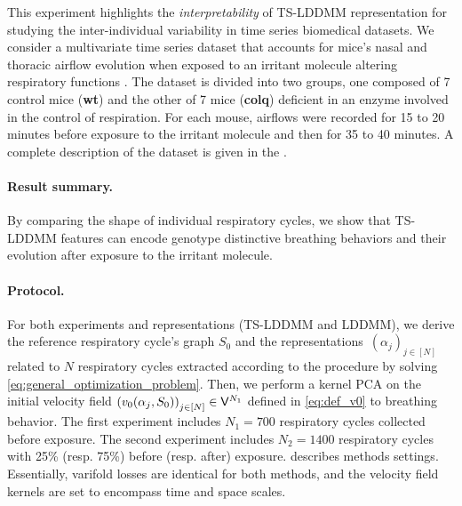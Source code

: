 
This experiment highlights the \textit{interpretability} of TS-LDDMM representation for studying the inter-individual variability in time series biomedical datasets. We consider a multivariate time series dataset that accounts for mice's nasal and thoracic airflow evolution when exposed to an irritant molecule altering respiratory functions \cite{nervo2019respiratory}.
The dataset is divided into two groups, one composed of 7 control mice (\textbf{wt}) and the other of 7 mice (\textbf{colq}) deficient in an enzyme involved in the control of respiration. For each mouse, airflows were recorded for 15 to 20 minutes before exposure to the irritant molecule and then for 35 to 40 minutes. A complete 
description of the dataset is given in the .

\paragraph{Result summary.} By comparing the shape of individual respiratory cycles, we show that TS-LDDMM features can encode genotype distinctive breathing behaviors and their evolution after exposure to the irritant molecule. 

\paragraph{Protocol.} For both experiments and representations (TS-LDDMM and LDDMM), we derive the reference respiratory cycle's graph $S_0$ and the representations $(\alpha_j)_{j\in[N]}$ related to $N$ respiratory cycles extracted according to the procedure \cite{germain2023unsupervised} by solving  \eqref{eq:general_optimization_problem}. Then, we perform a kernel PCA on the initial velocity field $\left(v_0(\alpha_j,S_0)\right)_{j\in[N]}\in \mathsf{V}^{N_1}$ defined in \eqref{eq:def_v0} to breathing behavior. The first experiment includes $N_1 = 700$ respiratory cycles collected before exposure. The second experiment includes $N_2 = 1400$ respiratory cycles with 25\% (resp. 75\%) before (resp. after) exposure.  describes methods settings. Essentially, varifold losses are identical for both methods, and the velocity field kernels are set to encompass time and space scales. 


